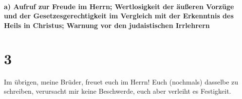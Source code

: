 \hypertarget{a-aufruf-zur-freude-im-herrn-wertlosigkeit-der-uxe4uuxdferen-vorzuxfcge-und-der-gesetzesgerechtigkeit-im-vergleich-mit-der-erkenntnis-des-heils-in-christus-warnung-vor-den-judaistischen-irrlehrern}{%
\paragraph{a) Aufruf zur Freude im Herrn; Wertlosigkeit der äußeren
Vorzüge und der Gesetzesgerechtigkeit im Vergleich mit der Erkenntnis
des Heils in Christus; Warnung vor den judaistischen
Irrlehrern}\label{a-aufruf-zur-freude-im-herrn-wertlosigkeit-der-uxe4uuxdferen-vorzuxfcge-und-der-gesetzesgerechtigkeit-im-vergleich-mit-der-erkenntnis-des-heils-in-christus-warnung-vor-den-judaistischen-irrlehrern}}

\hypertarget{section-2}{%
\section{3}\label{section-2}}

 Im übrigen, meine Brüder, freuet euch im Herrn! Euch
(nochmals) dasselbe zu schreiben, verursacht mir keine Beschwerde, euch
aber verleiht es Festigkeit.

